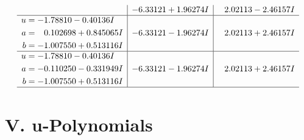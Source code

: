 \documentclass[1p]{elsarticle_modified}
\theoremstyle{definition}
\begin{document}
$$\begin{array}{c|c|c}
 & -6.33121 + 1.96274 I & \phantom{-}2.02113 - 2.46157 I \\ \hline\begin{aligned}
u &= -1.78810 - 0.40136 I \\
a &= \phantom{-}0.102698 + 0.845065 I \\
b &= -1.007550 + 0.513116 I\end{aligned}
 & -6.33121 - 1.96274 I & \phantom{-}2.02113 + 2.46157 I \\ \hline\begin{aligned}
u &= -1.78810 - 0.40136 I \\
a &= -0.110250 - 0.331949 I \\
b &= -1.007550 + 0.513116 I\end{aligned}
 & -6.33121 - 1.96274 I & \phantom{-}2.02113 + 2.46157 I\\
 \hline 
 \end{array}$$\newpage
\newpage\renewcommand{\arraystretch}{1}
\centering \section*{ V. u-Polynomials}
\end{document}
